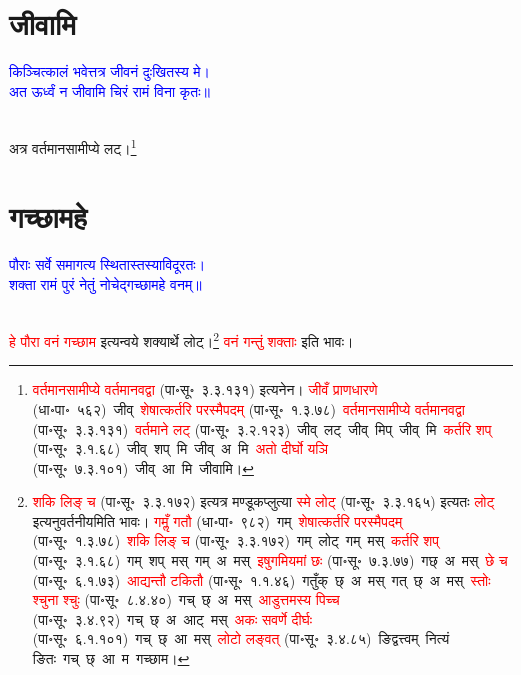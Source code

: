 \section[जीवामि]{जीवामि}
\centering\textcolor{blue}{किञ्चित्कालं भवेत्तत्र जीवनं दुःखितस्य मे।\nopagebreak\\
अत ऊर्ध्वं न जीवामि चिरं रामं विना कृतः॥}\nopagebreak\\
\\
\fontsize{14}{21}\selectfont\begin{sloppypar}\justifying\noindent\hspace{10mm} अत्र वर्तमान\-सामीप्ये लट्।\footnote{\textcolor{red}{वर्तमान\-सामीप्ये वर्तमानवद्वा} (पा॰सू॰~३.३.१३१) इत्यनेन। \textcolor{red}{जीवँ प्राणधारणे} (धा॰पा॰~५६२)~\arrow जीव्~\arrow \textcolor{red}{शेषात्कर्तरि परस्मैपदम्} (पा॰सू॰~१.३.७८)~\arrow \textcolor{red}{वर्तमान\-सामीप्ये वर्तमानवद्वा} (पा॰सू॰~३.३.१३१)~\arrow \textcolor{red}{वर्तमाने लट्} (पा॰सू॰~३.२.१२३)~\arrow जीव्~लट्~\arrow जीव्~मिप्~\arrow जीव्~मि~\arrow \textcolor{red}{कर्तरि शप्‌} (पा॰सू॰~३.१.६८)~\arrow जीव्~शप्~मि~\arrow जीव्~अ~मि~\arrow \textcolor{red}{अतो दीर्घो यञि} (पा॰सू॰~७.३.१०१)~\arrow जीव्~आ~मि~\arrow जीवामि।}\end{sloppypar}
\section[गच्छामहे]{गच्छामहे}
\centering\textcolor{blue}{पौराः सर्वे समागत्य स्थितास्तस्याविदूरतः।\nopagebreak\\
शक्ता रामं पुरं नेतुं नोचेद्गच्छामहे वनम्॥}\nopagebreak\\
\\
\fontsize{14}{21}\selectfont\begin{sloppypar}\justifying\noindent\hspace{10mm} \textcolor{red}{हे पौरा वनं गच्छाम} इत्यन्वये शक्यार्थे लोट्।\footnote{\textcolor{red}{शकि लिङ् च} (पा॰सू॰~३.३.१७२) इत्यत्र मण्डूक\-प्लुत्या \textcolor{red}{स्मे लोट्} (पा॰सू॰~३.३.१६५) इत्यतः \textcolor{red}{लोट्} इत्यनुवर्तनीयमिति भावः। \textcolor{red}{गमॢँ गतौ} (धा॰पा॰~९८२)~\arrow गम्~\arrow \textcolor{red}{शेषात्कर्तरि परस्मैपदम्} (पा॰सू॰~१.३.७८)~\arrow \textcolor{red}{शकि लिङ् च} (पा॰सू॰~३.३.१७२)~\arrow गम्~लोट्~\arrow गम्~मस्~\arrow \textcolor{red}{कर्तरि शप्‌} (पा॰सू॰~३.१.६८)~\arrow गम्~शप्~मस्~\arrow गम्~अ~मस्~\arrow \textcolor{red}{इषुगमियमां छः} (पा॰सू॰~७.३.७७)~\arrow गछ्~अ~मस्~\arrow \textcolor{red}{छे च} (पा॰सू॰~६.१.७३)~\arrow \textcolor{red}{आद्यन्तौ टकितौ} (पा॰सू॰~१.१.४६)~\arrow गतुँक्~छ्~अ~मस्~\arrow गत्~छ्~अ~मस्~\arrow \textcolor{red}{स्तोः श्चुना श्चुः} (पा॰सू॰~८.४.४०)~\arrow गच्~छ्~अ~मस्~\arrow \textcolor{red}{आडुत्तमस्य पिच्च} (पा॰सू॰~३.४.९२)~\arrow गच्~छ्~अ~आट्~मस्~\arrow \textcolor{red}{अकः सवर्णे दीर्घः} (पा॰सू॰~६.१.१०१)~\arrow गच्~छ्~आ~मस्~\arrow \textcolor{red}{लोटो लङ्वत्‌} (पा॰सू॰~३.४.८५)~\arrow ङिद्वत्त्वम्~\arrow नित्यं ङितः~\arrow गच्~छ्~आ~म~\arrow गच्छाम।} \textcolor{red}{वनं गन्तुं शक्ताः} इति भावः।\end{sloppypar}
